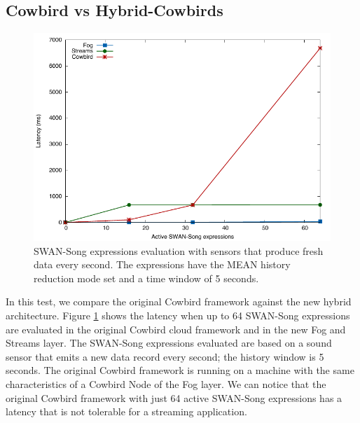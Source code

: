 \subsection{Cowbird vs Hybrid-Cowbirds}
 \begin{figure}[ht!]
\includegraphics[width=1\textwidth]{images/cowbird_comparison.pdf}
 \caption{SWAN-Song expressions evaluation with sensors that produce fresh data every second. The expressions have the MEAN history reduction mode set and a time window of 5 seconds.}
\label{fig:cowbird_comparison}
\end{figure}
In this test, we compare the original Cowbird framework against the new hybrid architecture. Figure \ref{fig:cowbird_comparison} shows the latency when up to 64 SWAN-Song expressions are evaluated in the original Cowbird cloud framework and in the new Fog and Streams layer. The SWAN-Song expressions evaluated are based on a sound sensor that emits a new data record every second; the history window is 5 seconds. The original Cowbird framework is running on a machine with the same characteristics of a Cowbird Node of the Fog layer. We can notice that the original Cowbird framework with just 64 active SWAN-Song expressions has a latency that is not tolerable for a streaming application.


